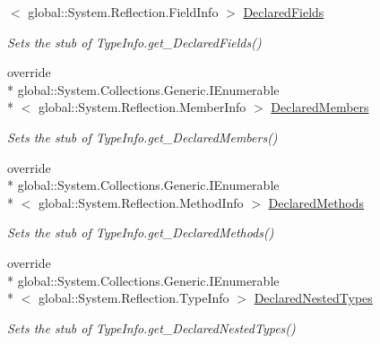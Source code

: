 \begin{DoxyCompactItemize}
$<$ global\-::\-System.\-Reflection.\-Field\-Info $>$ \hyperlink{class_system_1_1_reflection_1_1_fakes_1_1_stub_type_delegator_abe57bbceb219388d76a3197b6795c4ed}{Declared\-Fields}
\begin{DoxyCompactList}\small\item\em Sets the stub of Type\-Info.\-get\-\_\-\-Declared\-Fields()\end{DoxyCompactList}\item 
override \\*
global\-::\-System.\-Collections.\-Generic.\-I\-Enumerable\\*
$<$ global\-::\-System.\-Reflection.\-Member\-Info $>$ \hyperlink{class_system_1_1_reflection_1_1_fakes_1_1_stub_type_delegator_a5e754598f03310158377881c06a0dfa6}{Declared\-Members}
\begin{DoxyCompactList}\small\item\em Sets the stub of Type\-Info.\-get\-\_\-\-Declared\-Members()\end{DoxyCompactList}\item 
override \\*
global\-::\-System.\-Collections.\-Generic.\-I\-Enumerable\\*
$<$ global\-::\-System.\-Reflection.\-Method\-Info $>$ \hyperlink{class_system_1_1_reflection_1_1_fakes_1_1_stub_type_delegator_a7e7c8e0f2ae7aff901ac56edc923b245}{Declared\-Methods}
\begin{DoxyCompactList}\small\item\em Sets the stub of Type\-Info.\-get\-\_\-\-Declared\-Methods()\end{DoxyCompactList}\item 
override \\*
global\-::\-System.\-Collections.\-Generic.\-I\-Enumerable\\*
$<$ global\-::\-System.\-Reflection.\-Type\-Info $>$ \hyperlink{class_system_1_1_reflection_1_1_fakes_1_1_stub_type_delegator_a2a4f6f7a7f24a2bba7d92a208e0315db}{Declared\-Nested\-Types}
\begin{DoxyCompactList}\small\item\em Sets the stub of Type\-Info.\-get\-\_\-\-Declared\-Nested\-Types()\end{DoxyCompactList}\item 

\end{DoxyCompactItemize}
